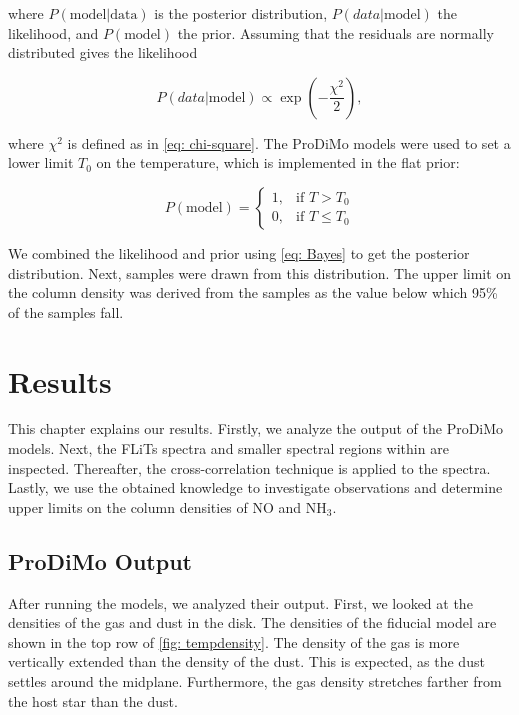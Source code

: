 \documentclass[oneside, single, authoryear, semicolon, 12pt]{lion-msc}
\newcommand{\4}{$_4$}
\newcommand{\3}{$_3$}
\newcommand{\2}{$_2$}
\begin{document}
where $P(\mathrm{model}|\mathrm{data})$ is the posterior distribution, $P(data|\mathrm{model})$ the likelihood, and $P(\mathrm{model})$ the prior. Assuming that the residuals are normally distributed gives the likelihood

\begin{equation}
    P(data|\mathrm{model})\propto\exp\left(-\frac{\chi^2}{2}\right),
\end{equation}

where $\chi^2$ is defined as in \autoref{eq: chi-square}. The ProDiMo models were used to set a lower limit $T_0$ on the temperature, which is implemented in the flat prior:

\begin{equation}
    P(\mathrm{model}) = 
    \begin{cases}
        1, & \text{if } T > T_0 \\
        0, & \text{if } T \leq T_0
    \end{cases}
\end{equation}

We combined the likelihood and prior using \autoref{eq: Bayes} to get the posterior distribution. Next, samples were drawn from this distribution. The upper limit on the column density was derived from the samples as the value below which 95\% of the samples fall. 


\chapter{Results}\label{Ch: Results}
This chapter explains our results. Firstly, we analyze the output of the ProDiMo models. Next, the FLiTs spectra and smaller spectral regions within are inspected. Thereafter, the cross-correlation technique is applied to the spectra. Lastly, we use the obtained knowledge to investigate observations and determine upper limits on the column densities of NO and NH\3.

\section{ProDiMo Output}\label{sec: Prodimo output}
After running the models, we analyzed their output. First, we looked at the densities of the gas and dust in the disk. The densities of the fiducial model are shown in the top row of \autoref{fig: tempdensity}. The density of the gas is more vertically extended than the density of the dust. This is expected, as the dust settles around the midplane. Furthermore, the gas density stretches farther from the host star than the dust.
\end{document}
